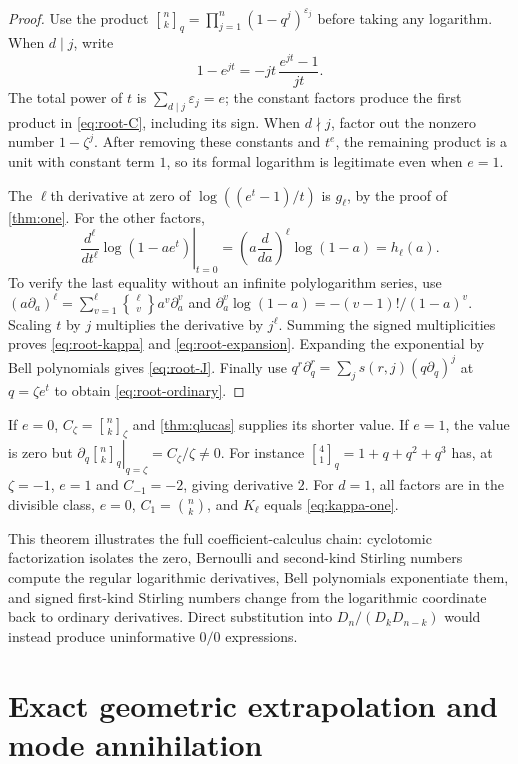 \documentclass[11pt,a4paper]{article}
\numberwithin{equation}{section}
\theoremstyle{definition}
\theoremstyle{remark}
\newcommand{\qb}[2]{\genfrac{[}{]}{0pt}{}{#1}{#2}_{q}}
\newcommand{\qbb}[3]{\genfrac{[}{]}{0pt}{}{#1}{#2}_{#3}}
\newcommand{\stir}[2]{\genfrac{\{} {\}}{0pt}{}{#1}{#2}}
\begin{document}
\begin{proof}
Use the product $\qb nk=\prod_{j=1}^n(1-q^j)^{\varepsilon_j}$ before taking
any logarithm. When $d\mid j$, write
\[
 1-e^{jt}=-jt\,\frac{e^{jt}-1}{jt}.
\]
The total power of $t$ is $\sum_{d\mid j}\varepsilon_j=e$; the constant factors
produce the first product in \eqref{eq:root-C}, including its sign.
When $d\nmid j$, factor out the nonzero number $1-\zeta^j$.
After removing these constants and $t^e$, the remaining product is a unit with
constant term $1$, so its formal logarithm is legitimate even when $e=1$.

The $\ell$th derivative at zero of
$\log((e^t-1)/t)$ is $g_\ell$, by the proof of \cref{thm:one}.
For the other factors,
\[
 \left.\frac{d^\ell}{dt^\ell}\log(1-ae^t)\right|_{t=0}
   =\left(a\frac d{da}\right)^\ell\log(1-a)=h_\ell(a).
\]
To verify the last equality without an infinite polylogarithm series, use
$(a\partial_a)^\ell=\sum_{v=1}^{\ell}\stir\ell v a^v\partial_a^v$
and $\partial_a^v\log(1-a)=-(v-1)!/(1-a)^v$.
Scaling $t$ by $j$ multiplies the derivative by $j^\ell$.
Summing the signed multiplicities proves \eqref{eq:root-kappa} and
\eqref{eq:root-expansion}. Expanding the exponential by Bell polynomials gives
\eqref{eq:root-J}. Finally use
$q^r\partial_q^r=\sum_js(r,j)(q\partial_q)^j$ at $q=\zeta e^t$ to obtain
\eqref{eq:root-ordinary}.
\end{proof}

If $e=0$, $C_\zeta=\qbb nk\zeta$ and \cref{thm:qlucas} supplies its shorter
value. If $e=1$, the value is zero but
$\left.\partial_q\qb nk\right|_{q=\zeta}=C_\zeta/\zeta\ne0$.
For instance $\qb41=1+q+q^2+q^3$ has, at $\zeta=-1$, $e=1$ and
$C_{-1}=-2$, giving derivative $2$.
For $d=1$, all factors are in the divisible class, $e=0$,
$C_1=\binom nk$, and $K_\ell$ equals \eqref{eq:kappa-one}.

This theorem illustrates the full coefficient-calculus chain: cyclotomic
factorization isolates the zero, Bernoulli and second-kind Stirling numbers
compute the regular logarithmic derivatives, Bell polynomials exponentiate them,
and signed first-kind Stirling numbers change from the logarithmic coordinate
back to ordinary derivatives. Direct substitution into $D_n/(D_kD_{n-k})$ would
instead produce uninformative $0/0$ expressions.

\section{Exact geometric extrapolation and mode annihilation}\label{sec:extrapolation}
\end{document}
